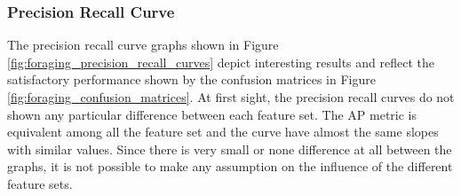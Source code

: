 \documentclass[../../Thesis.tex]{subfiles}
\begin{document}
			\subsubsection{Precision Recall Curve}
				The precision recall curve graphs shown in Figure \ref{fig:foraging_precision_recall_curves} depict interesting results and reflect the satisfactory performance shown by the confusion matrices in Figure \ref{fig:foraging_confusion_matrices}. At first sight, the precision recall curves do not shown any particular difference between each feature set. The AP metric is equivalent among all the feature set and the curve have almost the same slopes with similar values.  Since there is very small or none difference at all between the graphs, it is not possible to make any assumption on the influence of the different feature sets.
				\begin{figure}
					\centering
					\thinspace
\end{figure}
\end{document}
